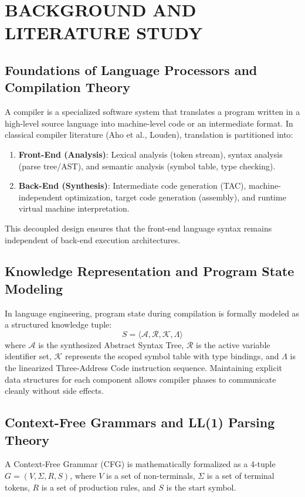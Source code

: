 \documentclass[12pt,a4paper]{report}
\begin{document}
\chapter{BACKGROUND AND LITERATURE STUDY}

\section{Foundations of Language Processors and Compilation Theory}
A compiler is a specialized software system that translates a program written in a high-level source language into machine-level code or an intermediate format. In classical compiler literature (Aho et al., Louden), translation is partitioned into:
\begin{enumerate}
    \item \textbf{Front-End (Analysis)}: Lexical analysis (token stream), syntax analysis (parse tree/AST), and semantic analysis (symbol table, type checking).
    \item \textbf{Back-End (Synthesis)}: Intermediate code generation (TAC), machine-independent optimization, target code generation (assembly), and runtime virtual machine interpretation.
\end{enumerate}
This decoupled design ensures that the front-end language syntax remains independent of back-end execution architectures.

\section{Knowledge Representation and Program State Modeling}
In language engineering, program state during compilation is formally modeled as a structured knowledge tuple:
\begin{equation}
    S = \langle \mathcal{A}, \mathcal{R}, \mathcal{K}, \Lambda \rangle
\end{equation}
where $\mathcal{A}$ is the synthesized Abstract Syntax Tree, $\mathcal{R}$ is the active variable identifier set, $\mathcal{K}$ represents the scoped symbol table with type bindings, and $\Lambda$ is the linearized Three-Address Code instruction sequence. Maintaining explicit data structures for each component allows compiler phases to communicate cleanly without side effects.

\section{Context-Free Grammars and LL(1) Parsing Theory}
A Context-Free Grammar (CFG) is mathematically formalized as a 4-tuple $G = (V, \Sigma, R, S)$, where $V$ is a set of non-terminals, $\Sigma$ is a set of terminal tokens, $R$ is a set of production rules, and $S$ is the start symbol.
\end{document}
